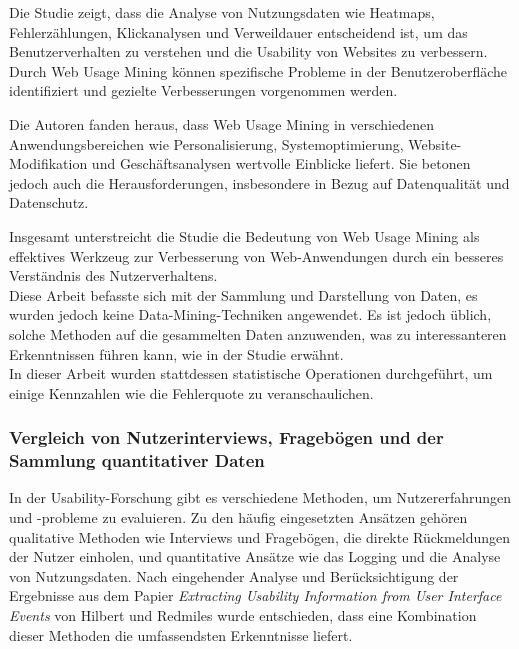 \documentclass[12pt,oneside]{article}
\begin{document}
Die Studie zeigt, dass die Analyse von Nutzungsdaten wie Heatmaps, Fehlerzählungen, Klickanalysen und Verweildauer entscheidend ist, um das Benutzerverhalten zu verstehen und die Usability von Websites zu verbessern. Durch Web Usage Mining können spezifische Probleme in der Benutzeroberfläche identifiziert und gezielte Verbesserungen vorgenommen werden.

Die Autoren fanden heraus, dass Web Usage Mining in verschiedenen Anwendungsbereichen wie Personalisierung, Systemoptimierung, Website-Modifikation und Geschäftsanalysen wertvolle Einblicke liefert. Sie betonen jedoch auch die Herausforderungen, insbesondere in Bezug auf Datenqualität und Datenschutz.

Insgesamt unterstreicht die Studie die Bedeutung von Web Usage Mining als effektives Werkzeug zur Verbesserung von Web-Anwendungen durch ein besseres Verständnis des Nutzerverhaltens.\\ 
Diese Arbeit befasste sich mit der Sammlung und Darstellung von Daten, es wurden jedoch keine Data-Mining-Techniken angewendet. Es ist jedoch üblich, solche Methoden auf die gesammelten Daten anzuwenden, was zu interessanteren Erkenntnissen führen kann, wie in der Studie erwähnt.\\
 In dieser Arbeit wurden stattdessen statistische Operationen durchgeführt, um einige Kennzahlen wie die Fehlerquote zu veranschaulichen.

\subsubsection{Vergleich von Nutzerinterviews, Fragebögen und der Sammlung quantitativer Daten}

In der Usability-Forschung gibt es verschiedene Methoden, um Nutzererfahrungen und -probleme zu evaluieren. Zu den häufig eingesetzten Ansätzen gehören qualitative Methoden wie Interviews und Fragebögen, die direkte Rückmeldungen der Nutzer einholen, und quantitative Ansätze wie das Logging und die Analyse von Nutzungsdaten. Nach eingehender Analyse und Berücksichtigung der Ergebnisse aus dem Papier \textit{Extracting Usability Information from User Interface Events} von Hilbert und Redmiles \cite{Hilbert2000} wurde entschieden, dass eine Kombination dieser Methoden die umfassendsten Erkenntnisse liefert.
\end{document}
